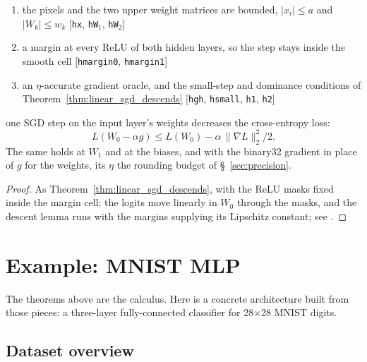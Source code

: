 \begin{theorem}
  \label{thm:mlp_sgd_descends}
  \leanok
  \Assume{}
  \begin{enumerate}
    \item the pixels and the two upper weight matrices are bounded,
          \(|x_i| \le a\) and \(|W_k| \le w_k\)
          \hfill[\texttt{hx}, \texttt{hW\(_1\)}, \texttt{hW\(_2\)}]
    \item a margin at every ReLU of both hidden layers, so the step stays
          inside the smooth cell \hfill[\texttt{hmargin0}, \texttt{hmargin1}]
    \item an \(\eta\)-accurate gradient oracle, and the small-step and
          dominance conditions of Theorem~\ref{thm:linear_sgd_descends}
          \hfill[\texttt{hgh}, \texttt{hsmall}, \texttt{h1}, \texttt{h2}]
  \end{enumerate}
  \Prove{} one SGD step on the input layer's weights decreases the
  cross-entropy loss:
  \[
    L(W_0 - \alpha g) \le L(W_0) - \alpha\,\|\nabla L\|_2^2/2 .
  \]
  The same holds at \(W_1\) and at the biases, and with the binary32
  gradient in place of \(g\) for the weights, its \(\eta\) the rounding
  budget of \S~\ref{sec:precision}.
\end{theorem}

\begin{proof}
\leanok
As Theorem~\ref{thm:linear_sgd_descends}, with the ReLU masks fixed inside
the margin cell: the logits move linearly in \(W_0\) through the masks, and
the descent lemma runs with the margins supplying its Lipschitz constant;
see .
\end{proof}

\section{Example: MNIST MLP}
\label{sec:mlp_mnist_example}

The theorems above are the calculus. Here is a concrete architecture
built from those pieces: a three-layer fully-connected classifier for
28$\times$28 MNIST digits.

\subsection*{Dataset overview}

